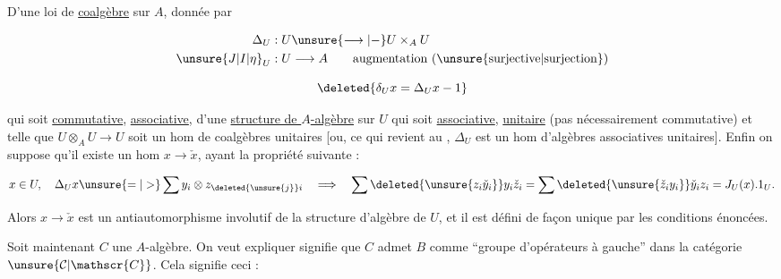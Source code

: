 

D'une loi de \uline{coalgèbre}  sur $A$,  donnée par

\[
\begin{aligned}
\Delta_U &: U\unsure{\longrightarrow|-}U\times_A U\\
\unsure{J|I|\eta}_U &: U\longrightarrow A\qquad \text{augmentation (\unsure{surjective|surjection})}
\end{aligned}
\]


\[
\deleted{\delta_U x=\Delta_U x-1}
\]

qui soit \uline{commutative}, \uline{associative}, d'une \uline{structure de $A$-algèbre} sur $U$ qui soit \uline{associative}, \uline{unitaire} (pas nécessairement commutative) et telle que $U\otimes_A U\to U$ soit un hom de coalgèbres unitaires [ou, ce qui revient au , $\Delta_U$ est un hom d'algèbres associatives unitaires]. Enfin on suppose qu'il existe un hom  $x\to\check{x}$, ayant la propriété suivante :

\[
x\in U,\quad \Delta_U x\unsure{=|>}\sum y_i\otimes z_{\deleted{\unsure{j}}i}
\quad\Longrightarrow\quad \sum\deleted{\unsure{z_i\check{y}_i}}y_i\check{z}_i=\sum\deleted{\unsure{\check{z}_i y_i}}\check{y}_i z_i=J_U(x).1_U.
\]

Alors $x\to\check{x}$ est un antiautomorphisme involutif de la structure d'algèbre de $U$, et  il est défini de façon unique par les conditions énoncées.

Soit maintenant $C$ une $A$-algèbre. On veut expliquer  signifie que $C$ admet $B$ comme ``groupe d'opérateurs à  gauche'' dans la catégorie $\unsure{\mathcal{C}|\mathscr{C}}$. Cela signifie ceci :
